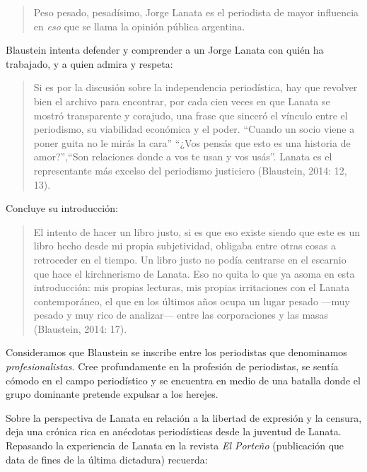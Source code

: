 \begin{quote}
Peso pesado, pesadísimo, Jorge Lanata es el periodista de mayor influencia en \emph{eso} que se llama la opinión pública argentina.
\end{quote}

Blaustein intenta defender y comprender a un Jorge Lanata con quién ha trabajado, y a quien admira y respeta:

\begin{quote}
Si es por la discusión sobre la independencia periodística, hay que revolver bien el archivo para encontrar, por cada cien veces en que Lanata se mostró transparente y corajudo, una frase que sinceró el vínculo entre el periodismo, su viabilidad económica y el poder. \enquote{Cuando un socio viene a poner guita no le mirás la cara} \enquote{¿Vos pensás que esto es una historia de amor?},\enquote{Son relaciones donde a vos te usan y vos usás}. Lanata es el representante más excelso del periodismo justiciero (Blaustein, 2014: 12, 13).
\end{quote}

Concluye su introducción:

\begin{quote}
El intento de hacer un libro justo, si es que eso existe siendo que este es un libro hecho desde mi propia subjetividad, obligaba entre otras cosas a retroceder en el tiempo. Un libro justo no podía centrarse en el escarnio que hace el kirchnerismo de Lanata. Eso no quita lo que ya asoma en esta introducción: mis propias lecturas, mis propias irritaciones con el Lanata contemporáneo, el que en los últimos años ocupa un lugar pesado ---muy pesado y muy rico de analizar--- entre las corporaciones y las masas (Blaustein, 2014: 17).
\end{quote}

Consideramos que Blaustein se inscribe entre los periodistas que denominamos \emph{profesionalistas}. Cree profundamente en la profesión de periodistas, se sentía cómodo en el campo periodístico y se encuentra en medio de una batalla donde el grupo dominante pretende expulsar a los herejes.

Sobre la perspectiva de Lanata en relación a la libertad de expresión y la censura, deja una crónica rica en anécdotas periodísticas desde la juventud de Lanata. Repasando la experiencia de Lanata en la revista \emph{El Porteño} (publicación que data de fines de la última dictadura) recuerda:

